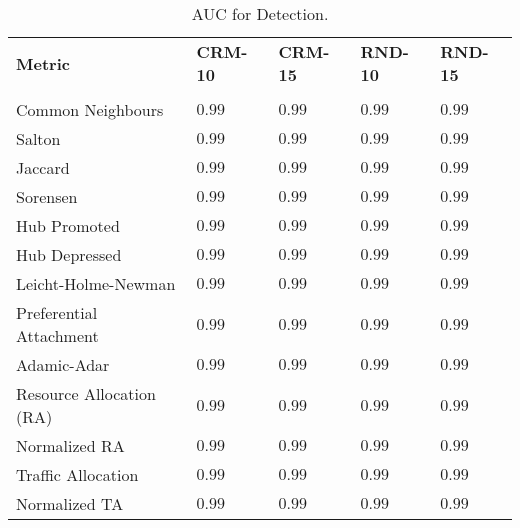 
\begin{table}[h]
	\centering
	\begin{tabular}{l l l l l}
	\toprule
	\textbf{Metric} & \textbf{CRM-10} & \textbf{CRM-15} & \textbf{RND-10} & \textbf{RND-15}\\\\
	\midrule
		Common Neighbours & $0.99$ & $0.99$ & $0.99$ & $0.99$ \\
		Salton  & $0.99$ & $0.99$ & $0.99$ & $0.99$ \\
		Jaccard  & $0.99$ & $0.99$ & $0.99$ & $0.99$ \\
		Sorensen   & $0.99$ & $0.99$ & $0.99$ & $0.99$ \\
		Hub Promoted  & $0.99$ & $0.99$ & $0.99$ & $0.99$ \\
		Hub Depressed  & $0.99$ & $0.99$ & $0.99$ & $0.99$ \\
		Leicht-Holme-Newman  & $0.99$ & $0.99$ & $0.99$ & $0.99$ \\
		Preferential Attachment  & $0.99$ & $0.99$ & $0.99$ & $0.99$ \\
		Adamic-Adar  & $0.99$ & $0.99$ & $0.99$ & $0.99$ \\
		Resource Allocation (RA)  & $0.99$ & $0.99$ & $0.99$ & $0.99$ \\
		Normalized RA  & $0.99$ & $0.99$ & $0.99$ & $0.99$ \\
		Traffic Allocation  & $0.99$ & $0.99$ & $0.99$ & $0.99$ \\
		Normalized TA  & $0.99$ & $0.99$ & $0.99$ & $0.99$ \\
	\bottomrule
	\end{tabular}
	\label{tab:auc-detection}
	\caption{AUC for Detection.}
\end{table}


